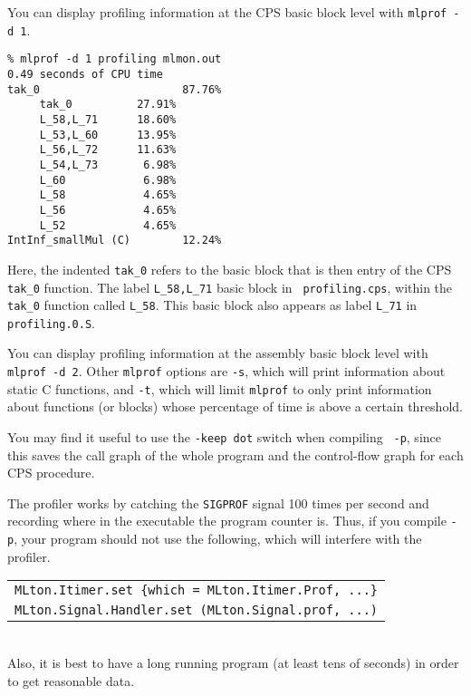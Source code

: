 You can display profiling information at the CPS basic block level with
{\tt mlprof -d 1}.

\begin{verbatim}
% mlprof -d 1 profiling mlmon.out
0.49 seconds of CPU time
tak_0                      87.76%
     tak_0          27.91%       
     L_58,L_71      18.60%       
     L_53,L_60      13.95%       
     L_56,L_72      11.63%       
     L_54,L_73       6.98%       
     L_60            6.98%       
     L_58            4.65%       
     L_56            4.65%       
     L_52            4.65%       
IntInf_smallMul (C)        12.24%
\end{verbatim}
Here, the indented {\tt tak\_0} refers to the basic block that is then entry of
the CPS {\tt tak\_0} function.  The label {\tt L\_58,L\_71} basic block in {\tt
profiling.cps}, within the {\tt tak\_0} function called {\tt L\_58}.  This basic
block also appears as label {\tt L\_71} in {\tt profiling.0.S}.

You can display profiling information at the assembly basic block level with
{\tt mlprof -d 2}.  Other {\tt mlprof} options are
{\tt -s}, which will print information about static C functions, and {\tt -t},
which will limit {\tt mlprof} to only print information about functions (or
blocks) whose percentage of time is above a certain threshold.

You may find it useful to use the {\tt -keep dot} switch when compiling {\tt
-p}, since this saves the call graph of the whole program and the control-flow
graph for each CPS procedure.

The profiler works by catching the {\tt SIGPROF} signal 100 times per second and
recording where in the executable the program counter is.  Thus, if you compile
{\tt -p}, your program should not use the following, which will interfere with
the profiler.\\
\begin{tabular}{l}
\tt MLton.Itimer.set \{which = MLton.Itimer.Prof, ...\}\\
\tt MLton.Signal.Handler.set (MLton.Signal.prof, ...)
\end{tabular}\\
Also, it is best to have a long running program (at least tens of seconds) in
order to get reasonable data. 

